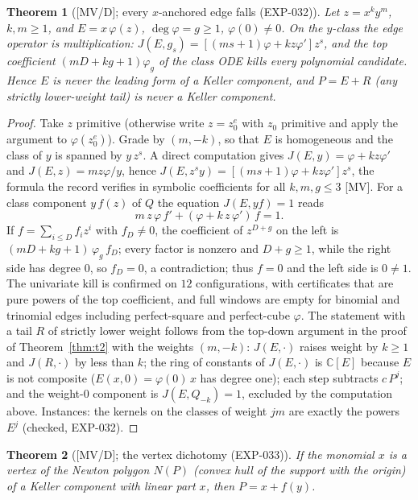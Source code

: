 \documentclass[11pt]{article}
\newtheorem{theorem}{Theorem}[section]
\theoremstyle{remark}
\newcommand{\C}{\mathbb{C}}
\begin{document}
\begin{theorem}[{[MV/D]}; every $x$-anchored edge falls (EXP-032)]\label{thm:t3}
Let $z = x^k y^m$, $k, m \ge 1$, and $E = x\,\varphi(z)$, $\deg\varphi = g \ge 1$, $\varphi(0)\ne0$. On the
$y$-class the edge operator is \emph{multiplication}:
$J(E, g_s) = [(ms + 1)\varphi + k z \varphi'] z^s$, and the top coefficient
$(mD + kg + 1)\varphi_g$ of the class ODE kills every polynomial candidate. Hence $E$ is
never the leading form of a Keller component, and $P = E + R$ (any strictly lower-weight
tail) is never a Keller component.
\end{theorem}

\begin{proof}
Take $z$ primitive (otherwise write $z=z_0^e$ with $z_0$ primitive and apply the argument to $\varphi(z_0^e)$). Grade by $(m,-k)$, so that $E$ is homogeneous and the class of $y$ is spanned by $y\,z^s$. A direct computation
gives $J(E,y)=\varphi+kz\varphi'$ and $J(E,z)=mz\varphi/y$, hence $J(E,z^sy)=[(ms+1)\varphi+kz\varphi']z^s$,
the formula the record verifies in symbolic coefficients for all $k,m,g\le3$ [MV]. For a class component
$y\,f(z)$ of $Q$ the equation $J(E,yf)=1$ reads
\begin{equation}\label{eq:classode}
m\,z\,\varphi\,f'+(\varphi+k\,z\,\varphi')\,f=1 .
\end{equation}
If $f=\sum_{i\le D}f_iz^i$ with $f_D\ne0$, the coefficient of $z^{D+g}$ on the left is
$(mD+kg+1)\,\varphi_g\,f_D$; every factor is nonzero and $D+g\ge1$, while the right side has degree $0$, so
$f_D=0$, a contradiction; thus $f=0$ and the left side is $0\ne1$. The univariate kill is confirmed on $12$ configurations,
with certificates that are pure powers of the top coefficient, and full windows are empty for binomial and
trinomial edges including perfect-square and perfect-cube $\varphi$. The statement with a tail $R$ of strictly lower weight follows from the top-down argument in the proof of Theorem~\ref{thm:t2} with the
weights $(m,-k)$: $J(E,\cdot)$ raises weight by $k\ge1$ and $J(R,\cdot)$ by less than $k$; the ring of constants of $J(E,\cdot)$ is $\C[E]$ because $E$ is
not composite ($E(x,0)=\varphi(0)\,x$ has degree one); each step subtracts $c\,P^j$; and the weight-$0$ component is $J(E,Q_{-k})=1$, excluded by the
computation above. Instances: the kernels on the classes of weight $jm$ are exactly the powers $E^j$ (checked, EXP-032).
\end{proof}

\begin{theorem}[{[MV/D]}; the vertex dichotomy (EXP-033)]\label{thm:t4}
If the monomial $x$ is a vertex of the Newton polygon $N(P)$ (convex hull of the support
with the origin) of a Keller component with linear part $x$, then $P = x + f(y)$.
\end{theorem}
\end{document}
